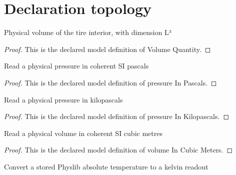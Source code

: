 \section{Declaration topology}
\begin{definition}
  \label{def:physics:phyx-mini-0399:phyxminiproblems-problemphyxmini0399-volumequantity}
  Physical volume of the tire interior, with dimension L³
\end{definition}
\begin{proof}
  This is the declared model definition of Volume Quantity.
\end{proof}
\begin{definition}
  \label{def:physics:phyx-mini-0399:phyxminiproblems-problemphyxmini0399-pressureinpascals}
  Read a physical pressure in coherent SI pascals
\end{definition}
\begin{proof}
  This is the declared model definition of pressure In Pascals.
\end{proof}
\begin{definition}
  \label{def:physics:phyx-mini-0399:phyxminiproblems-problemphyxmini0399-pressureinkilopascals}
  Read a physical pressure in kilopascals
\end{definition}
\begin{proof}
  This is the declared model definition of pressure In Kilopascals.
\end{proof}
\begin{definition}
  \label{def:physics:phyx-mini-0399:phyxminiproblems-problemphyxmini0399-volumeincubicmeters}
  Read a physical volume in coherent SI cubic metres
\end{definition}
\begin{proof}
  This is the declared model definition of volume In Cubic Meters.
\end{proof}
\begin{definition}
  \label{def:physics:phyx-mini-0399:phyxminiproblems-problemphyxmini0399-temperatureinkelvins}
  Convert a stored Physlib absolute temperature to a kelvin readout
\end{definition}
